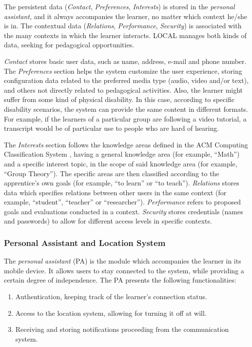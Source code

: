 \documentclass[5p,authoryear]{elsarticle}
\begin{document}
The persistent data (\emph{Contact}, \emph{Preferences}, \emph{Interests}) is
stored in the \emph{personal assistant}, and it always accompanies the learner,
no matter which context he/she is in. The contextual data (\emph{Relations},
\emph{Performance}, \emph{Security}) is associated with the many contexts in
which the learner interacts. LOCAL manages both kinds of data, seeking for
pedagogical opportunities. 

\emph{Contact} stores basic user data, such as name, address, e-mail and phone
number.  The \emph{Preferences} section helps the system customize the user
experience, storing configuration data related to the preferred media type
(audio, video and/or text), and others not directly related to pedagogical
activities. Also, the learner might suffer from some kind of physical
disability. In this case, according to specific disability scenarios, the
system can provide the same content in different formats. For example, if the
learners of a particular group are following a video tutorial, a transcript
would be of particular use to people who are hard of hearing. 

The \emph{Interests} section follows the knowledge areas defined in the ACM
Computing Classification System \citep{acm98}, having a general knowledge area
(for example, ``Math'') and a specific interest topic, in the scope of said
knowledge area (for example, ``Group Theory''). The specific areas are then
classified according to the apprentice's own goals (for example, ``to learn''
or ``to teach''). \emph{Relations} stores data which specifies relations
between other users in the same context (for example, ``student'', ``teacher''
or ``researcher''). \emph{Performance} refers to proposed goals and evaluations
conducted in a context. \emph{Security} stores credentials (names and
passwords) to allow for different access levels in specific contexts. 


%
%
\subsubsection{Personal Assistant and Location System}

The \emph{personal assistant} (PA) is the module which accompanies the learner
in its mobile device. It allows users to stay connected to the system, while
providing a certain degree of independence. The PA presents the following
functionalities: 

\begin{enumerate}
  
  \item Authentication, keeping track of the learner's connection status.
  
  \item Access to the location system, allowing for turning it off at will.

  \item Receiving and storing notifications proceeding from the communication
        system.

\end{enumerate}  
\end{document}
